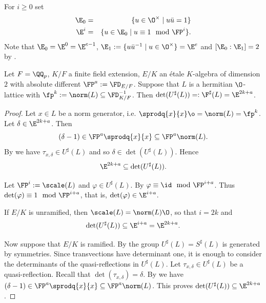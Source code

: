 For $i\geq 0$ set
\begin{eqnarray*}
 \E_0 & = &\{u \in \O^\times \mid u \bar u =1\}\\
\E^i &=& \{u \in \E_0 \mid u \equiv 1 \mod \FP^i\}.
\end{eqnarray*}
Note that $\E_0 = \E^0 = \E^{e-1}$, $\E_1:= \{u \bar u ^{-1} \mid u \in \O^\times\} = \E^e$ and $[\E_0:\E_1]=2$ by \cite[3.4, 3.5]{Kirschmer2019}.

\begin{theorem}\label{detUsharp}
 Let $F=\QQ_p$, $K/F$ a finite field extension, $E/K$ an étale $K$-algebra of dimension $2$ with absolute different $\FP^a:=\FD_{E/F}$.
 Suppose that $L$ is a hermitian $\O$-lattice with $\fp^k:=\norm(L) \subseteq \FD_{K/F}^{-1}$.
 Then $\det(U^\sharp(L)) =:\F^\sharp(L) = \E^{2k+a}$.
\end{theorem}
\begin{proof}
 Let $x \in L$ be a norm generator, i.e. $\sprodq{x}{x} \o = \norm(L) = \fp^k$.
 Let $\delta \in \E^{2k+a}$. Then
 \[(\delta-1) \in \FP^{a}\sprodq{x}{x}\subseteq \FP^{a}\norm(L).\]
 By  we have $\tau_{x,\delta} \in U^\sharp(L)$ and so $\delta \in \det(U^\sharp(L))$. Hence
 \[\E^{2k+a} \subseteq \det(U^\sharp(L)).\]

 Let $\FP^i:=\scale(L)$ and $\varphi \in U^\sharp(L)$. By  $\varphi \equiv \id \mod \FP^{i+a}$. Thus $\det(\varphi) \equiv 1 \mod \FP^{i+a}$, that is, $\det(\varphi) \in \E^{i+a}$.

 If $E/K$ is unramified, then $\scale(L)=\norm(L)\O$, so that $i=2k$ and
 \[\det(U^\sharp(L)) \subseteq \E^{i+a}=\E^{2k+a}.\]

 Now suppose that $E/K$ is ramified.
 By  the group $U^\sharp(L) = S^\sharp(L)$ is generated by symmetries.
 Since transvections have determinant one,
 it is enough to consider the determinants of the quasi-reflections in $U^\sharp(L)$.
 Let $\tau_{x,\delta} \in U^\sharp(L)$ be a quasi-reflection. Recall that $\det(\tau_{x,\delta}) = \delta$.
 By  we have $(\delta -1) \in \FP^a \sprodq{x}{x} \subseteq \FP^a \norm(L)$.
 This proves $\det(U^\sharp(L)) \subseteq \E^{2k + a}$.
\end{proof}

